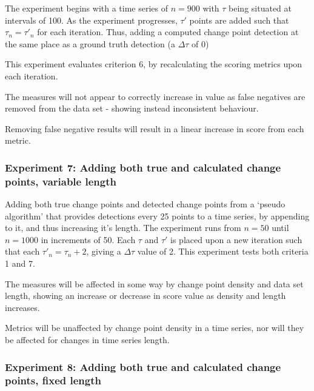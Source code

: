 \documentclass[../main.tex]{subfiles}
\begin{document}
The experiment begins with a time series of $n=900$ with $\tau$ being situated at intervals of 100. As the experiment progresses, $\tau'$ points are added such that $\tau_n = \tau'_n$ for each iteration. Thus, adding a computed change point detection at the same place as a ground truth detection (a $\Delta \tau$ of 0)

This experiment evaluates criterion 6, by recalculating the scoring metrics upon each iteration.

\begin{hypothesis}
    The measures will not appear to correctly increase in value as false negatives are removed from the data set - showing instead inconsistent behaviour.
\end{hypothesis}

\begin{nullhypothesis}
    Removing false negative results will result in a linear increase in score from each metric.
\end{nullhypothesis}

\subsubsection{Experiment 7: Adding both true and calculated change points, variable length}

Adding both true change points and detected change points from a `pseudo algorithm' that provides detections every 25 points to a time series, by appending to it, and thus increasing it's length. The experiment runs from $n=50$ until $n=1000$ in increments of 50. Each $\tau$ and $\tau'$ is placed upon a new iteration such that each $\tau'_n = \tau_n + 2$, giving a $\Delta \tau$ value of 2. This experiment tests both criteria 1 and 7.

\begin{hypothesis}
    The measures will be affected in some way by change point density and data set length, showing an increase or decrease in score value as density and length increases.
\end{hypothesis}

\begin{nullhypothesis}
    Metrics will be unaffected by change point density in a time series, nor will they be affected for changes in time series length.
\end{nullhypothesis}

\subsubsection{Experiment 8: Adding both true and calculated change points, fixed length}
\end{document}
